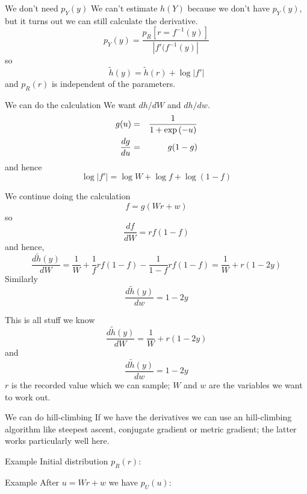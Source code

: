 \documentclass{beamer}
\newcommand{\crish}{\color{reddish}}
\newcommand{\cbla}{\color{black}}
\newcommand{\cblu}{\color{blue}}
\begin{document}
\begin{frame}{We don't need $p_Y(y)$}
We can't estimate \crish$h(Y)$\cbla{} because we don't have $p_Y(y)$,
but it turns out we can still calculate the derivative.
\crish
$$
p_Y(y)=\frac{p_R[r=f^{-1}(y)]}{|f'(f^{-1}(y)|}
$$
\cbla{}
so \crish
$$
\tilde{h}(y)=\tilde{h}(r)+\log{|f'|}
$$
\cbla
and \crish$p_R(r)$\cbla{} is independent of the parameters.
\end{frame}

\begin{frame}{We can do the calculation}
  \cblu{}We want $dh/dW$ and $dh/dw$.\cbla{}
  \crish
  \begin{eqnarray*}
g(u)&=&\frac{1}{1+\exp{(-u)}}\cr
\frac{dg}{du}&=&g(1-g)
  \end{eqnarray*}
  \cbla
  and hence
  \crish
$$
\log{|f'|}=\log{W}+\log{f}+\log{(1-f)}
$$
\cbla{}
\end{frame}

\begin{frame}{We continue doing the calculation}
  \crish$$
f=g(Wr+w)
$$\cbla{}
so
\crish$$
\frac{df}{dW}=rf(1-f)
$$\cbla{}
and hence, 
\crish$$
\frac{d\tilde{h}(y)}{dW}=\frac{1}{W}+\frac{1}{f}rf(1-f)-\frac{1}{1-f}rf(1-f)=\frac{1}{W}+r(1-2y)
$$\cbla{}
Similarly
\crish$$
\frac{d\tilde{h}(y)}{dw}=1-2y
$$\cbla{}
\end{frame}


\begin{frame}{This is all stuff we know}
\crish$$
\frac{d\tilde{h}(y)}{dW}=\frac{1}{W}+r(1-2y)
$$\cbla{}
and
\crish$$
\frac{d\tilde{h}(y)}{dw}=1-2y
$$\cbla{}\crish$r$\cbla{} is the recorded value which we can sample;
\crish$W$\cbla{} and \crish$w$\cbla{} are the variables we want to
work out.
\end{frame}

\begin{frame}{We can do hill-climbing}
If we have the derivatives we can use an hill-climbing algorithm
like steepest ascent, conjugate gradient or metric gradient; the
latter works particularly well here.
\end{frame}

\begin{frame}{Example}
  Initial distribution \cblu$p_R(r)$\cbla:
  \begin{center}
  \end{center}
\end{frame}

\begin{frame}{Example}
  After \crish$u=Wr+w$\cbla{} we have \cblu$p_U(u)$\cbla:
  \begin{center}
  \end{center}
\end{frame}
  
\end{document}
